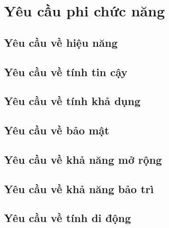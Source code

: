 \section{Yêu cầu phi chức năng}
\subsection{Yêu cầu về hiệu năng}
\subsection{Yêu cầu về tính tin cậy}
\subsection{Yêu cầu về tính khả dụng}
\subsection{Yêu cầu về bảo mật}
\subsection{Yêu cầu về khả năng mở rộng}
\subsection{Yêu cầu về khả năng bảo trì}
\subsection{Yêu cầu về tính di động}
